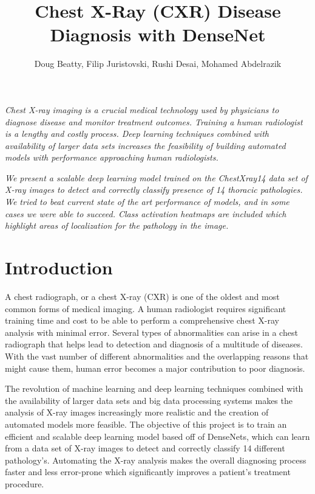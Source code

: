 \documentclass{amia}
\begin{document}
\title{Chest X-Ray (CXR) Disease Diagnosis with DenseNet}

\author{Doug Beatty, Filip Juristovski, Rushi Desai, Mohamed Abdelrazik}


\maketitle


\textit{Chest X-ray imaging \cite{ref1} is a crucial medical technology used by physicians to diagnose disease and monitor treatment outcomes. Training a human radiologist is a lengthy and costly process. Deep learning techniques combined with availability of larger data sets increases the feasibility of building automated models with performance approaching human radiologists.}

\textit{We present a scalable deep learning model trained on the ChestXray14 \cite{ref7} data set of X-ray images to detect and correctly classify presence of 14 thoracic pathologies. We tried to beat current state of the art performance of models, and in some cases we were able to succeed. Class activation heatmaps are included which highlight areas of localization for the pathology in the image.}

\section*{Introduction}
A chest radiograph\cite{ref1}, or a chest X-ray (CXR) is one of the oldest and most common forms of medical imaging. A human radiologist requires significant training time and cost to be able to perform a comprehensive chest X-ray analysis with minimal error. Several types of abnormalities can arise in a chest radiograph that helps lead to detection and diagnosis of a multitude of diseases. With the vast number of different abnormalities and the overlapping reasons that might cause them, human error becomes a major contribution to poor diagnosis.

The revolution of machine learning and deep learning techniques combined with the availability of larger data sets\cite{ref2} and big data processing systems\cite{ref3} makes the analysis of X-ray images increasingly more realistic and the creation of automated models more feasible. The objective of this project is to train an efficient and scalable deep learning model based off of DenseNets\cite{ref4}, which can learn from a data set of X-ray images to detect and correctly classify 14 different pathology's. Automating the X-ray analysis makes the overall diagnosing process faster and less error-prone which significantly improves a patient’s treatment procedure.
\end{document}
